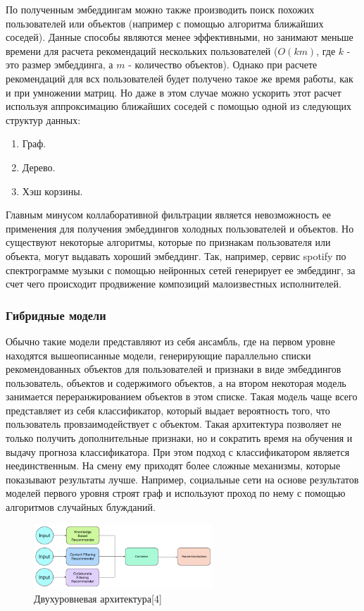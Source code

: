 \documentclass[bachelor, och, coursework]{SCWorks}
\begin{document}
По полученным эмбеддингам можно также производить поиск похожих пользователей или объектов (например с
помощью алгоритма ближайших соседей). Данные способы являются менее эффективными, но занимают меньше
времени для расчета рекомендаций нескольких пользователей ($O(km)$, где $k$ - это размер эмбеддинга,
а $m$ - количество объектов). Однако при расчете рекомендаций для всх пользователей будет получено
такое же время работы, как и при умножении матриц. Но даже в этом случае можно ускорить этот расчет
используя аппроксимацию ближайших соседей с помощью одной из следующих структур данных:

\begin{enumerate}
    \item Граф.
    \item Дерево.
    \item Хэш корзины.
\end{enumerate}

Главным минусом коллаборативной фильтрации является невозможность ее применения для получения эмбеддингов холодных
пользователей и объектов. Но существуют некоторые алгоритмы, которые по признакам пользователя или объекта,
могут выдавать хороший эмбеддинг. Так, например, сервис spotify по спектрограмме музыки с помощью нейронных сетей
генерирует ее эмбеддинг, за счет чего происходит продвижение композиций малоизвестных исполнителей.

\subsubsection{Гибридные модели}
Обычно такие модели представляют из себя ансамбль, где на первом уровне находятся вышеописанные модели,
генерирующие параллельно списки рекомендованных объектов для пользователей и признаки в виде эмбеддингов
пользователь, объектов и содержимого объектов, а на втором некоторая модель занимается переранжированием объектов в этом списке.
Такая модель чаще всего представляет из себя классификатор, который выдает вероятность того, что пользователь провзаимодействует
с объектом. Такая архитектура позволяет не только получить дополнительные признаки, но и сократить время
на обучения и выдачу прогноза классификатора. При этом подход с классификатором является неединственным.
На смену ему приходят более сложные механизмы, которые показывают результаты лучше. Например, социальные
сети на основе результатов моделей первого уровня строят граф и используют проход по нему с помощью
алгоритмов случайных блужданий.

\begin{figure}[H]
    \centering
    \includegraphics[width=0.6\textwidth]{pic/4}
    \caption{Двухуровневая архитектура[4]}
    \label{fig:img1}
\end{figure}
\end{document}
